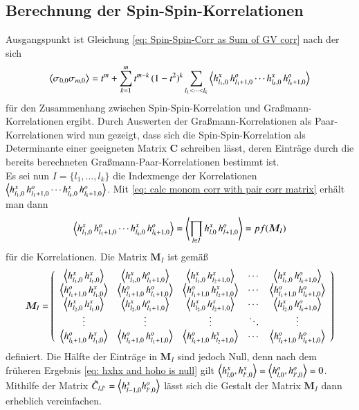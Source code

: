 \subsection{Berechnung der Spin-Spin-Korrelationen}
Ausgangspunkt ist Gleichung \eqref{eq: Spin-Spin-Corr as Sum of GV corr} nach der sich
\begin{equation} \nonumber
    \left\langle \sigma_{0,0} \sigma_{m,0} \right\rangle = t^m  + \sum_{k = 1}^{m} t^{m-k} \, (1-t^2)^{k} \sum_{l_1 < \dots < l_k}  \left\langle h_{l_1,0}^x\, h_{l_1+1,0}^o \cdots h_{l_k,0}^x\, h_{l_k+1,0}^o \right\rangle
\end{equation} für den Zusammenhang zwischen Spin-Spin-Korrelation und Graßmann-Korrelationen ergibt. Durch Auswerten der Graßmann-Korrelationen als Paar-Korrelationen wird nun gezeigt, dass sich die Spin-Spin-Korrelation als Determinante einer geeigneten Matrix $\bm{C}$ schreiben lässt, deren Einträge durch die bereits berechneten Graßmann-Paar-Korrelationen bestimmt ist. \\
\newpage
\noindent Es sei nun $I = \{l_1,\dots,l_k\}$ die Indexmenge der Korrelationen $\left\langle h_{l_1,0}^x\, h_{l_1+1,0}^o \cdots h_{l_k,0}^x\, h_{l_k+1,0}^o \right\rangle$.
Mit \eqref{eq: calc monom corr with pair corr matrix} erhält man dann
\begin{equation}
 \left\langle h_{l_1,0}^x\, h_{l_1+1,0}^o \cdots h_{l_k,0}^x\, h_{l_k+1,0}^o \right\rangle = \left\langle \prod_{l \in I} h_{l,0}^x\, h_{l+1,0}^o \right\rangle = pf(\bm{M}_I ) \\
\end{equation}
für die Korrelationen. Die Matrix $\bm{M}_I$ ist gemäß
\begin{equation}
\bm{M}_I 
    = \left(\begin{array}{cccccc} 
      \left\langle h_{l_1,0}^x\, h_{l_1,0}^x \right\rangle  &  \left\langle h_{l_1,0}^x\, h_{l_1+1,0}^o \right\rangle & \left\langle h_{l_1,0}^x\, h_{l_2+1,0}^x \right\rangle & \cdots & \left\langle h_{l_1,0}^x\, h_{l_k+1,0}^o \right\rangle \\
      \left\langle h_{l_1+1,0}^o\, h_{l_1,0}^x \right\rangle  &  \left\langle h_{l_1+1,0}^o\, h_{l_1+1,0}^o \right\rangle & \left\langle h_{l_1+1,0}^o\, h_{l_2+1,0}^x \right\rangle & \cdots & \left\langle h_{l_1+1,0}^o\, h_{l_k+1,0}^o \right\rangle \\
      \left\langle h_{l_2,0}^x\, h_{l_1,0}^x \right\rangle  &  \left\langle h_{l_2,0}^x\, h_{l_1+1,0}^o \right\rangle & \left\langle h_{l_2,0}^x\, h_{l_2+1,0}^x \right\rangle & \cdots & \left\langle h_{l_2,0}^x\, h_{l_k+1,0}^o \right\rangle \\ 
      \vdots & \vdots & \vdots & \ddots & \vdots \\
      \left\langle h_{l_k+1,0}^o\, h_{l_1,0}^x \right\rangle  &  \left\langle h_{l_k+1,0}^o\, h_{l_1+1,0}^o \right\rangle & \left\langle h_{l_k+1,0}^o\, h_{l_2+1,0}^x \right\rangle & \cdots & \left\langle h_{l_k+1,0}^o\, h_{l_k+1,0}^o \right\rangle \\
      \end{array}\right)
\end{equation}
 definiert. Die Hälfte der Einträge in $\bm{M}_I$ sind jedoch Null, denn nach dem früheren Ergebnis \eqref{eq: hxhx and hoho is null} gilt $\left\langle h_{l,0}^x,h_{l',0}^x \right\rangle = \left\langle h_{l,0}^o,h_{l',0}^o \right\rangle = 0$. Mithilfe der Matrix $\tilde{C}_{l,l'} = \left\langle h_{l-1,0}^x h_{l',0}^o \right\rangle$ lässt sich die Gestalt der Matrix $\bm{M}_I $ dann erheblich vereinfachen.

